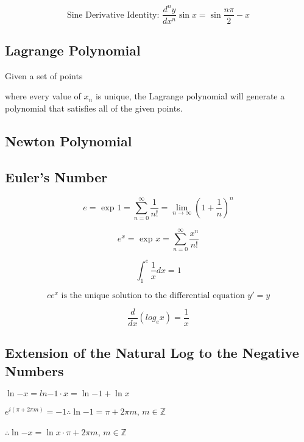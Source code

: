 	$$\text{Sine Derivative Identity: }\frac{d^n y}{d x^n} \sin{x} = \sin{ \frac{n\pi}{2} - x} $$

	\subsection{Lagrange Polynomial}

	Given a set of points

	where every value of $x_{n}$ is unique, the Lagrange polynomial will generate a polynomial that satisfies all of the given points.

	\subsection{Newton Polynomial}

	\subsection{Euler's Number}

	$$e = \text{ exp } 1 = \displaystyle{\sum_{n=0}^{\infty} \frac{1}{n!} = \lim_{n\to\infty} (1+\frac{1}{n})^{n}}$$

	$$e^{x} = \text{ exp } x = \displaystyle{\sum_{n=0}^{\infty} \frac{x^{n}}{n!}}$$

	$$\displaystyle{\int_{1}^{e}\frac{1}{x}dx}=1$$

	$$ce^{x} \text{ is the unique solution to the differential equation } y' = y$$

	$$\frac{d}{dx} (log_{e}{x}) = \frac{1}{x}$$

	\subsection{Extension of the Natural Log to the Negative Numbers}

	$\ln{-x} = ln{-1 \cdot x} = \ln{-1} + \ln{x}$

	$e^{i (\pi + 2 \pi m)} = -1 \therefore \ln{-1} = \pi + 2 \pi m$, $m \in \mathbb{Z}$

	$\therefore \ln{-x} = \ln{x} \cdot \pi + 2 \pi m$, $m \in \mathbb{Z}$


